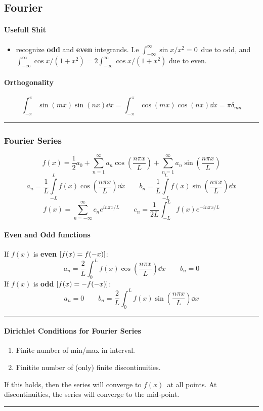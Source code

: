 \documentclass[10pt,a4paper]{article}
\renewcommand{\b}{\textbf}
\renewcommand{\exp}{e^}
\newcommand{\infint}{\int_{-\infty}^{\infty}}
\newcommand{\zeroinfint}{\int_{-\infty}^{\infty}}
\newcommand{\oneinfsum}{\sum_{n=1}^{\infty}}
\newcommand{\holine}{\rule{286pt}{1pt}}
\newcommand{\half}{\frac{1}{2}}
\begin{document}
\begin{multicols}{2}
\newpage
\part*{Fourier}
\subsection*{Usefull Shit}
\begin{itemize}
    \item recognize \textbf{odd} and \textbf{even} integrands. I.e $\infint \sin{x}/x^2 = 0$ due to odd, and $\infint\cos{x}/(1+x^2) = 2\zeroinfint\cos{x}/(1+x^2)$ due to even.
\end{itemize}

\subsection*{Orthogonality}
\[
    \int_{-\pi}^\pi \sin(mx)\sin(nx) \dd{x} = \int_{-\pi}^\pi \cos(mx)\cos(nx) \dd{x} = \pi \delta_{mn}
\]


\holine
\section*{Fourier Series}
\[
    f(x) = \half a_0 + \oneinfsum a_n\cos(\frac{n\pi x}{L}) + \oneinfsum a_n\sin(\frac{n\pi x}{L})
\]
\[
    a_n = \frac{1}{L}\int\limits_{-L}^{L}f(x) \cos(\frac{n\pi x}{L}) \dd{x} \quad\quad
    b_n = \frac{1}{L}\int\limits_{-L}^{L}f(x) \sin(\frac{n\pi x}{L}) \dd{x}
\]
\[
    f(x) = \sum_{n=-\infty}^{\infty} c_n \exp{in\pi x/L}  \quad\quad
    c_n = \frac{1}{2L}\int_{-L}^L f(x) \exp{-in\pi x/L}
\]

\subsection*{Even and Odd functions}
If $f(x)$ is \b{even} $\qty[f(x) = f(-x)]$:
\[
    a_n = \frac{2}{L}\int_0^L f(x)\cos(\frac{n\pi x}{L}) \dd{x} \quad\quad b_n = 0
\]
If $f(x)$ is \b{odd} $\qty[f(x) = -f(-x)]$:
\[
    a_n = 0 \quad\quad b_n = \frac{2}{L}\int_0^L f(x)\sin(\frac{n\pi x}{L}) \dd{x}
\]


\holine 
\subsection*{Dirichlet Conditions for Fourier Series}
\begin{enumerate}
    \item Finite number of min/max in interval.
    \item Finitite number of (only) finite discontinuities.
\end{enumerate}
If this holds, then the series will converge to $f(x)$ at all points. At discontinuities, the series will converge to the mid-point.
\holine

\end{multicols}
\end{document}
